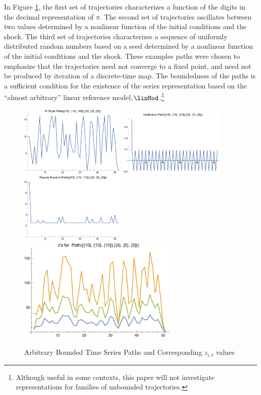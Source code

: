 \documentclass[12pt]{article}
\begin{document}
In Figure \ref{arbpaths}, the first set of trajectories characterizes 
a function of the digits in the decimal representation of $\pi$.  
The second set of trajectories  oscillates between two values
determined by  a nonlinear function of the initial conditions and the shock.
The third set of trajectories characterizes a sequence of uniformly distributed random numbers based on a seed determined by  a nonlinear function of  the initial conditions and the shock.
These examples paths were chosen to emphasize that the trajectories
 need not converge to a fixed point, and 
need not be produced by iteration of a discrete-time map.
The boundedness of the paths is a sufficient condition for the existence 
of the series representation based on the ``almost arbitrary'' linear reference model,$\linMod$.\footnote{Although useful in some contexts,
this paper will not investigate representations for families of
unbounded trajectories.}


\begin{figure}
  \centering
\includegraphics[width=2in]{piPath.pdf}
\includegraphics[width=2in]{oscillPath.pdf}
\includegraphics[width=2in]{pseudoPath.pdf}
\includegraphics[width=3in]{theZs.pdf}  
  
  \caption{Arbitrary Bounded Time Series Paths and Corresponding $z_{i,t}$ values}\label{arbpaths}
\end{figure}
\end{document}
